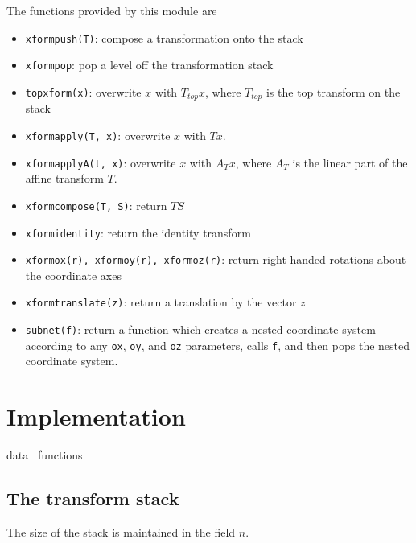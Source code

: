 The functions provided by this module are
\begin{itemize}
  \item {\tt{}xform{}push(T)}: compose a transformation onto the stack
  \item {\tt{}xform{}pop}: pop a level off the transformation stack
  \item {\tt{}top{}xform(x)}: overwrite $x$ with $T_\mathit{top} x$,
        where $T_\mathit{top}$ is the top transform on the stack
  \item {\tt{}xform{}apply(T,\ x)}: overwrite $x$ with $Tx$.
  \item {\tt{}xform{}applyA(t,\ x)}: overwrite $x$ with $A_T x$,
        where $A_T$ is the linear part of the affine transform $T$.
  \item {\tt{}xform{}compose(T,\ S)}: return $TS$
  \item {\tt{}xform{}identity}: return the identity transform
  \item {\tt{}xform{}ox(r),\ xform{}oy(r),\ xform{}oz(r)}:
        return right-handed rotations about the coordinate axes
  \item {\tt{}xform{}translate(z)}: return a translation by the
        vector $z$
  \item {\tt{}subnet(f)}: return a function which creates a nested
        coordinate system according to any {\tt{}ox}, {\tt{}oy},
        and {\tt{}oz} parameters, calls {\tt{}f}, and then pops the
        nested coordinate system.
\end{itemize}


\section{Implementation}

\endmoddef
\LA{}data~{\nwtagstyle{}}\RA{}
\LA{}functions~{\nwtagstyle{}}\RA{}
\nwendcode{}\nwdocspar

\subsection{The transform stack}

The size of the stack is maintained in the field $n$.

